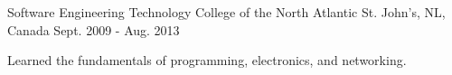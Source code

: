 


\begin{cventries}


\cventry
{Software Engineering Technology} %
{College of the North Atlantic} %
{St. John's, NL, Canada} %
{Sept. 2009 - Aug. 2013} %
{ %
\begin{cvitems}
\item {Learned the fundamentals of programming, electronics, and networking.}
\end{cvitems}
}


\end{cventries}